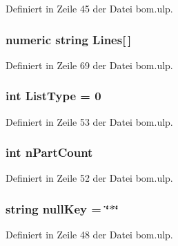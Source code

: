 Definiert in Zeile 45 der Datei bom.\+ulp.

\hypertarget{bom_8ulp_ae670799ce8e4e5c10333c5ffd950f723}{}
\subsubsection[{Lines}]{\setlength{\rightskip}{0pt plus 5cm}numeric string Lines\mbox{[}$\,$\mbox{]}}\label{bom_8ulp_ae670799ce8e4e5c10333c5ffd950f723}


Definiert in Zeile 69 der Datei bom.\+ulp.

\hypertarget{bom_8ulp_ac4dbacd07ed6fd2299214fe82e75344f}{}
\subsubsection[{List\+Type}]{\setlength{\rightskip}{0pt plus 5cm}int List\+Type = 0}\label{bom_8ulp_ac4dbacd07ed6fd2299214fe82e75344f}


Definiert in Zeile 53 der Datei bom.\+ulp.

\hypertarget{bom_8ulp_a52faf0e7daa8d9d1bbbf02e52c9ec521}{}
\subsubsection[{n\+Part\+Count}]{\setlength{\rightskip}{0pt plus 5cm}int n\+Part\+Count}\label{bom_8ulp_a52faf0e7daa8d9d1bbbf02e52c9ec521}


Definiert in Zeile 52 der Datei bom.\+ulp.

\hypertarget{bom_8ulp_aaa6babfc550269768d017226e5515586}{}
\subsubsection[{null\+Key}]{\setlength{\rightskip}{0pt plus 5cm}string null\+Key = \char`\"{}$\ast$\char`\"{}}\label{bom_8ulp_aaa6babfc550269768d017226e5515586}


Definiert in Zeile 48 der Datei bom.\+ulp.

\hypertarget{bom_8ulp_a7ad4d91e419214c185366026054e1ee8}{}
